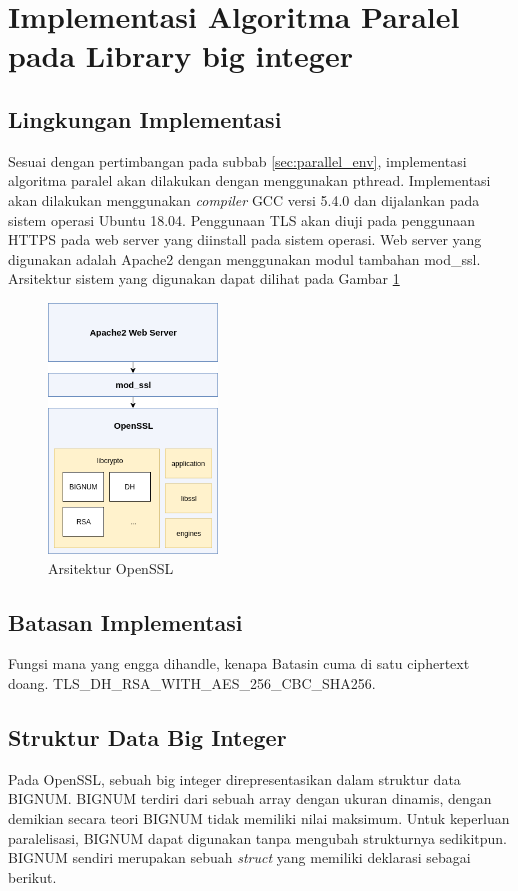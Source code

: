 
\section{Implementasi Algoritma Paralel pada Library big integer}
\subsection{Lingkungan Implementasi}
Sesuai dengan pertimbangan pada subbab \ref{sec:parallel_env}, implementasi algoritma paralel akan dilakukan dengan menggunakan pthread. Implementasi akan dilakukan menggunakan \textit{compiler} GCC versi 5.4.0 dan dijalankan pada sistem operasi Ubuntu 18.04. Penggunaan TLS akan diuji pada penggunaan HTTPS pada web server yang diinstall pada sistem operasi. Web server yang digunakan adalah Apache2 dengan menggunakan modul tambahan mod\_ssl. Arsitektur sistem yang digunakan dapat dilihat pada Gambar \ref{fig:openssl_arch}


\begin{figure}[h]
  \centering
  \includegraphics[width=0.4\textwidth]{resources/ch-4/implementation_arch.png}
  \caption{Arsitektur OpenSSL}
  \label{fig:openssl_arch}
\end{figure}

\subsection{Batasan Implementasi}
Fungsi mana yang engga dihandle, kenapa
Batasin cuma di satu ciphertext doang. TLS\_DH\_RSA\_WITH\_AES\_256\_CBC\_SHA256.

\subsection{Struktur Data Big Integer} \label{sec:bignum_struct}
Pada OpenSSL, sebuah big integer direpresentasikan dalam struktur data BIGNUM. BIGNUM terdiri dari sebuah array dengan ukuran dinamis, dengan demikian secara teori BIGNUM tidak memiliki nilai maksimum. Untuk keperluan paralelisasi, BIGNUM dapat digunakan tanpa mengubah strukturnya sedikitpun. BIGNUM sendiri merupakan sebuah \textit{struct} yang memiliki deklarasi sebagai berikut.

